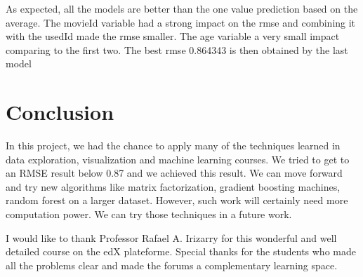 \documentclass[]{article}
\begin{document}
As expected, all the models are better than the one value prediction
based on the average. The movieId variable had a strong impact on the
rmse and combining it with the usedId made the rmse smaller. The age
variable a very small impact comparing to the first two. The best rmse
0.864343 is then obtained by the last model

\section{Conclusion}\label{conclusion}

In this project, we had the chance to apply many of the techniques
learned in data exploration, visualization and machine learning courses.
We tried to get to an RMSE result below 0.87 and we achieved this
result. We can move forward and try new algorithms like matrix
factorization, gradient boosting machines, random forest on a larger
dataset. However, such work will certainly need more computation power.
We can try those techniques in a future work.

I would like to thank Professor Rafael A. Irizarry for this wonderful
and well detailed course on the edX plateforme. Special thanks for the
students who made all the problems clear and made the forums a
complementary learning space.
\end{document}
